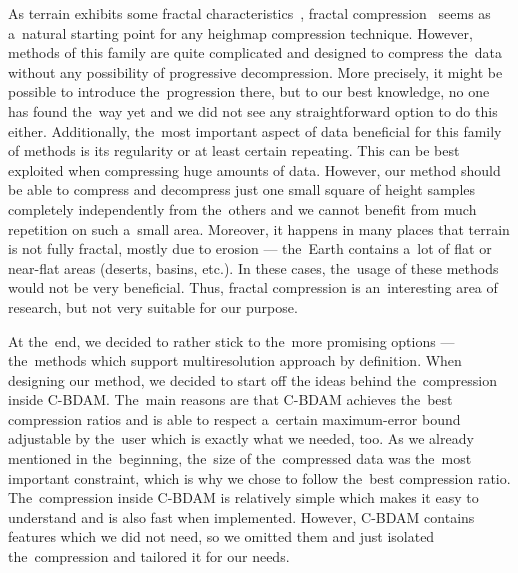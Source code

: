  As terrain exhibits some fractal characteristics~\cite{fractalChar}, fractal compression~\cite{fractal} seems as a~natural starting point for any heighmap compression technique. However, methods of this family are quite complicated and designed to compress the~data without any possibility of progressive decompression. More precisely, it might be possible to introduce the~progression there, but to our best knowledge, no one has found the~way yet and we did not see any straightforward option to do this either. Additionally, the~most important aspect of data beneficial for this family of methods is its regularity or at least certain repeating. This can be best exploited when compressing huge amounts of data. However, our method should be able to compress and decompress just one small square of height samples completely independently from the~others and we cannot benefit from much repetition on such a~small area. Moreover, it happens in many places that terrain is not fully fractal, mostly due to erosion --- the~Earth contains a~lot of flat or near-flat areas (deserts, basins, etc.). In these cases, the~usage of these methods would not be very beneficial. Thus, fractal compression is an~interesting area of research, but not very suitable for our purpose.
  
 At the~end, we decided to rather stick to the~more promising options --- the~methods which support multiresolution approach by definition. When designing our method, we decided to start off the ideas behind the~compression inside C-BDAM. The~main reasons are that C-BDAM achieves the~best compression ratios and is able to respect a~certain maximum-error bound adjustable by the~user which is exactly what we needed, too. As we already mentioned in the~beginning, the~size of the~compressed data was the~most important constraint, which is why we chose to follow the~best compression ratio. The~compression inside C-BDAM is relatively simple which makes it easy to understand and is also fast when implemented. However, C-BDAM contains features which we did not need, so we omitted t\textsl{}hem and just isolated the~compression and tailored it for our needs. 
 
